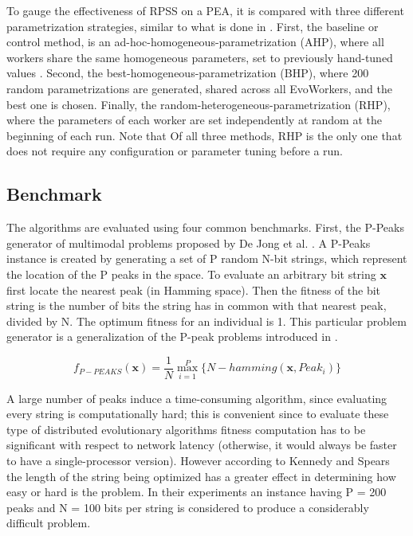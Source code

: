 \documentclass{sig-alternate}
\begin{document}
To gauge the effectiveness of RPSS on a PEA, it is compared with three different parametrization strategies, similar to what is done in \cite{fuku1,fuku2}.
First, the baseline or control method, is an ad-hoc-homogeneous-parametrization (AHP),
where all workers share the same homogeneous parameters, set to previously hand-tuned values \cite{Evospace,Musart,FreeLunch,Fire}.
Second, the best-homogeneous-parametrization (BHP), where 200 random parametrizations are generated,
shared across all EvoWorkers, and the best one is chosen.
Finally, the random-heterogeneous-parametrization (RHP), where the parameters of each worker are set independently at random at
the beginning of each run.
Note that Of all three methods, RHP is the only one that does not require any configuration or parameter tuning before a run.




\subsection{Benchmark}
\label{ss:benchmark}
The algorithms are evaluated using four common benchmarks.
First, the P-Peaks generator of multimodal problems proposed by De Jong et al. \cite{Jong:PS97}.
A P-Peaks instance is created by generating a set of P random N-bit
strings, which represent the location of the P peaks in the space. To
evaluate an arbitrary bit string \begin{math} \mathbf{x} \end{math}
first locate the nearest peak (in Hamming space). Then the fitness of
the bit string is the number of bits the string has in common with
that nearest peak, divided by N. The optimum fitness for an individual
is 1. This particular problem generator is a generalization of the
P-peak problems introduced in \cite{Jong:1990}.            

\begin{equation}
f_{P-PEAKS}(\mathbf{x})=\frac{1}{N} \overset{P}{\max_{i=1}} \{N-hamming(\mathbf{x},Peak_i)   \}
\end{equation}

A large number of peaks induce a time-consuming algorithm,
since evaluating every string is computationally hard; this is
convenient since to evaluate these type of distributed evolutionary
algorithms fitness computation has to be significant with respect to
network latency (otherwise, it would always be faster to have a
single-processor version). However
according to Kennedy and Spears \cite{Kennedy:1998ch} the length of
the string being optimized has a greater effect in determining how
easy or hard is the problem. In their experiments an instance having P
= 200 peaks and N = 100 bits per string is considered to produce a
considerably difficult problem.
\end{document}
